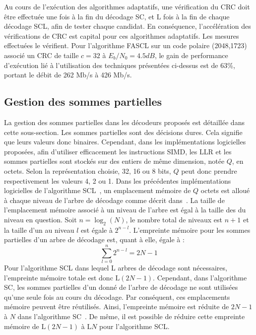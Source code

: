 Au cours de l'exécution des algorithmes adaptatifs, une vérification du CRC doit être effectuée une fois à la fin du décodage SC, et $\mathrm{L}$ fois à la fin de chaque décodage SCL, afin de tester chaque candidat. En conséquence, l'accélération des vérifications de CRC est capital pour ces algorithmes adaptatifs.
Les mesures effectuées le vérifient. Pour l'algorithme FASCL sur un code polaire (2048,1723) associé un CRC de taille $c=32$ à $E_b/N_0 = 4.5dB$, le gain de performance d'exécution lié à l'utilisation des techniques présentées ci-dessus est de 63\%, portant le débit de 262 Mb/s à 426 Mb/s.

\subsection{Gestion des sommes partielles}
La gestion des sommes partielles dans les décodeurs proposés est détaillée dans cette sous-section.
Les sommes partielles sont des décisions dures. Cela signifie que leurs valeurs donc binaires. Cependant, dans les implémentations logicielles proposées, afin d'utiliser efficacement les instructions SIMD, les LLR et les sommes partielles sont stockés sur des entiers de même dimension, notée $Q$, en octets. Selon la représentation choisie, 32, 16 ou 8 bits, $Q$ peut donc prendre respectivement les valeurs 4, 2 ou 1. 
Dans les précédentes implémentations logicielles de l'algorithme SCL~\cite{sarkis_fast_2016,sarkis_increasing_2014,shen_low-latency_2016}, un emplacement mémoire de $Q$ octets est alloué à chaque niveau de l'arbre de décodage comme décrit dans~\cite{tal_list_2011}. La taille de l'emplacement mémoire associé à un niveau de l'arbre est égal à la taille des \noeuds du niveau en question. Soit $n=\log_2(N)$, le nombre total de niveaux est $n+1$ et la taille d'un \noeud au niveau $l$ est égale à $2^{n-l}$. L'empreinte mémoire pour les sommes partielles d'un arbre de décodage est, quant à elle, égale à : 
\begin{equation}
\sum^n_{l=0}2^{n-l}=2N-1
\end{equation}
Pour l'algorithme SCL dans lequel L arbres de décodage sont nécessaires, l'empreinte mémoire totale est donc $\mathrm{L}(2N-1)$. Cependant, dans l'algorithme SC, les sommes partielles d'un \noeud donné de l'arbre de décodage ne sont utilisées qu'une seule fois au cours du décodage. Par conséquent, ces emplacements mémoire peuvent être réutilisés. Ainsi, l'empreinte mémoire est réduite de $2N-1$ à $N$ dans l'algorithme SC~\cite{leroux_hardware_2011}. De même, il est possible de réduire cette empreinte mémoire de $\mathrm{L}(2N-1)$ à $\mathrm{L}N$ pour l'algorithme SCL.

